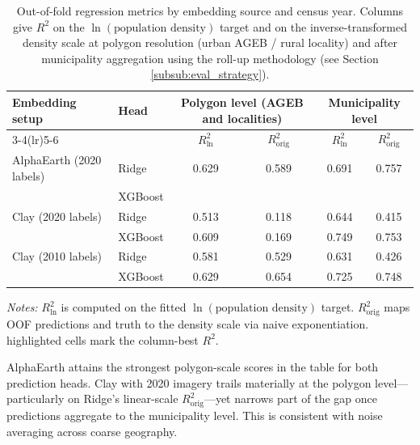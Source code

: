 \documentclass[12pt,letterpaper]{article}
\begin{document}
\begin{table}[H]
  \centering
  \caption{Out-of-fold regression metrics by embedding source and census year. Columns give $R^2$ on the $\ln(\text{population density})$ target and on the inverse-transformed density scale at polygon resolution (urban AGEB / rural locality) and after municipality aggregation using the roll-up methodology (see Section \ref{subsub:eval_strategy}).}
  \label{tab:results_embedding_comparison}
  \footnotesize
  \renewcommand{\arraystretch}{1.15}
  \setlength{\tabcolsep}{5pt}
  \begin{tabular}{@{} l l cccc @{}}
    \toprule
    \textbf{Embedding setup} & \textbf{Head} & 
    \multicolumn{2}{c}{\textbf{Polygon level (AGEB and localities)}} & 
    \multicolumn{2}{c}{\textbf{Municipality level}} \\
    \cmidrule(lr){3-4}\cmidrule(lr){5-6}
    & & $R^2_{\ln}$ & $R^2_{\mathrm{orig}}$ & $R^2_{\ln}$ & $R^2_{\mathrm{orig}}$ \\
    \midrule
    AlphaEarth (2020 labels) & Ridge    & 0.629 & 0.589 & 0.691 & 0.757 \\
                             & XGBoost  & \cellcolor{teal!15}{0.727} & \cellcolor{teal!15}{0.701} & \cellcolor{teal!15}{0.879} & \cellcolor{teal!15}{0.898} \\
    \addlinespace[2pt]
    Clay (2020 labels)       & Ridge    & 0.513 & 0.118 & 0.644 & 0.415 \\
                             & XGBoost  & 0.609 & 0.169 & 0.749 & 0.753 \\
    \addlinespace[2pt]
    Clay (2010 labels)       & Ridge    & 0.581 & 0.529 & 0.631 & 0.426 \\
                             & XGBoost  & 0.629 & 0.654 & 0.725 & 0.748 \\
    \bottomrule
  \end{tabular}

  \medskip
  \raggedright
  \textit{Notes:} $R^2_{\ln}$ is computed on the fitted $\ln(\text{population density})$ target. $R^2_{\mathrm{orig}}$ maps OOF predictions and truth to the density scale via naive exponentiation. \colorbox{teal!15}{highlighted} cells mark the column-best $R^2$.
\end{table}


AlphaEarth attains the strongest polygon-scale scores in the table for both prediction heads. Clay with 2020 imagery trails materially at the polygon level---particularly on Ridge's linear-scale $R^2_{\mathrm{orig}}$---yet narrows part of the gap once predictions aggregate to the municipality level. This is consistent with noise averaging across coarse geography. 
\end{document}

